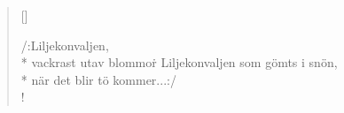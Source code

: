 
\settowidth{\versewidth}{när det blir tö kommer}



\begin{verse}[\versewidth]

/:Liljekonvaljen,\\*
vackrast utav blommor\.\*
Liljekonvaljen som gömts i snön,\\*
när det blir tö kommer...:/\\!


\end{verse}

